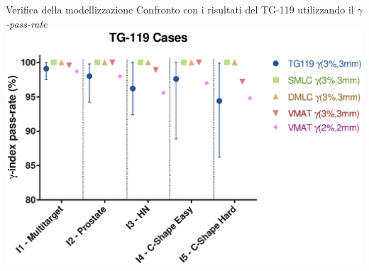 \documentclass{beamer}
\begin{document}



\begin{frame}{Verifica della modellizzazione}
\footnotesize
\centering
\alert{Confronto con i risultati del TG-119 utilizzando il $\gamma$\textit{-pass-rate}}\\\vspace{.5cm}
\includegraphics[width=.85\textwidth]{../cap2/TG119_Plots/TG_119_gamma.eps}
\end{frame}
\end{document}
